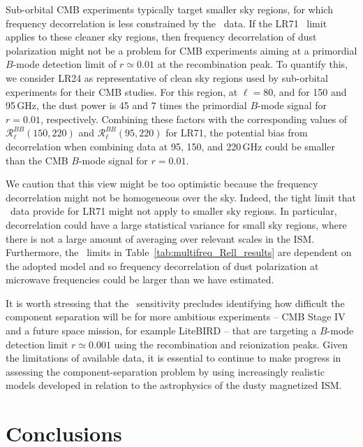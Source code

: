 \documentclass[longauth,traditabstract]{aa}
\begin{document}
Sub-orbital CMB experiments typically target smaller sky regions, for which frequency decorrelation is less constrained by the \Planck\ data.
If the LR71 \Planck\ limit applies to these cleaner sky regions, then frequency decorrelation of dust polarization might not be a problem for CMB experiments aiming at a primordial $B$-mode detection limit of $r\simeq0.01$ at the recombination peak.
To quantify this, we consider LR24 as representative of clean sky regions
used by sub-orbital experiments for their CMB studies.
For this region, at $\ell =80$, and for 150 and 95\,GHz, the dust power is 45 and 7 times the primordial $B$-mode signal for $r=0.01$, respectively. 
Combining these factors with the corresponding values of $\mathcal{R}_{\ell}^{BB} (150, 220)$ and $\mathcal{R}_{\ell}^{BB}(95, 220)$ for LR71, the potential bias from decorrelation when combining data at 95, 150, and 220\,GHz could be smaller than the CMB $B$-mode signal for $r=0.01$. 

We caution that this view might be too optimistic because the frequency decorrelation might not be homogeneous over the sky. 
Indeed, the tight limit that \Planck\ data provide for LR71 might not apply to smaller sky regions. In particular, 
decorrelation could have a large statistical variance for small sky regions, where there is not a large amount of averaging over relevant scales in the ISM. 
Furthermore, the \Planck\ limits in Table~\ref{tab:multifreq_Rell_results} are dependent on the adopted model and so
frequency decorrelation of dust polarization at microwave frequencies could be larger than we have estimated.

It is worth stressing that the \Planck\ sensitivity precludes identifying how difficult the component separation will be
for more ambitious experiments -- CMB Stage IV \citep{CMBS4ScienceBook} and a future space mission, for example LiteBIRD \citep{Ishino16} -- that are targeting a $B$-mode detection limit $r\simeq0.001$ 
using the recombination and reionization peaks. Given the limitations of available data, it is essential to continue to make progress in assessing the component-separation problem 
by using increasingly realistic models developed in relation to the astrophysics of the dusty magnetized ISM.


\section{Conclusions}
\label{sec:summary}
\end{document}
